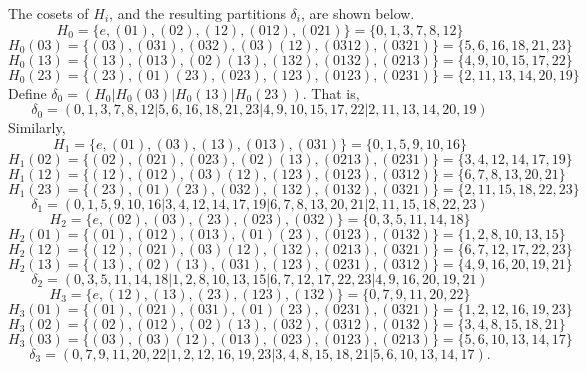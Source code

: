 The cosets of $H_i$, and the resulting partitions $\delta_i$, are shown below.
{\small
  \[
H_0 = \{e, (01), (02), (12), (012), (021)\} = \{0, 1, 3, 7, 8, 12\}
\]
\[
H_0(03) = \{(03), (031), (032), (03)(12), (0312), (0321)\} = \{5,6,16,18,21,23\}
\]
\[
H_0(13) = \{(13), (013), (02)(13), (132), (0132), (0213)\} = \{4,9,10,15,17,22\}
\]
\[
H_0(23) = \{(23), (01)(23), (023), (123), (0123), (0231)\} = \{2,11,13,14,20,19\}
\]
Define $\delta_0 = (H_0|H_0(03)|H_0(13)|H_0(23))$. That is,
\[
\delta_0 = (0, 1, 3, 7, 8, 12|5,6,16,18,21,23|4,9,10,15,17,22|2,11,13,14,20,19)
\]
Similarly,
\[
H_1 = \{e, (01), (03), (13), (013), (031)\} = \{0, 1, 5, 9, 10, 16\}
\]
\[
H_1(02) = \{(02), (021), (023), (02)(13), (0213), (0231)\} = \{3, 4, 12, 14, 17, 19\}
\]
\[
H_1(12) = \{(12), (012), (03)(12), (123), (0123), (0312)\} = \{6, 7, 8, 13, 20, 21\}
\]
\[
H_1(23) = \{(23), (01)(23), (032), (132), (0132), (0321)\} = \{2, 11, 15, 18, 22, 23\}
\]
\[
\delta_1 = (0, 1, 5, 9, 10, 16|3, 4, 12, 14, 17, 19|6, 7, 8, 13, 20, 21|2, 11, 15, 18, 22, 23)
\]
\[
H_2 = \{e, (02), (03), (23), (023), (032)\} = \{0, 3, 5, 11, 14, 18\}
\]
\[
H_2(01) = \{(01), (012), (013), (01)(23), (0123), (0132)\} = \{1,2,8,10,13,15\}
\]
\[
H_2(12) = \{(12), (021), (03)(12), (132), (0213), (0321)\} = \{6,7,12,17,22,23\}
\]
\[
H_2(13) = \{(13), (02)(13), (031), (123), (0231), (0312)\} = \{4,9,16,20,19,21\}
\]
\[
\delta_2 = (0,3,5,11,14,18|1,2,8,10,13,15|6,7,12,17,22,23|4,9,16,20,19,21)
\]
\[
H_3 = \{e, (12), (13), (23), (123), (132)\} = \{0, 7, 9, 11, 20, 22\}
\]
\[
H_3(01) = \{(01), (021), (031), (01)(23), (0231), (0321)\} = \{1,2,12,16,19,23\}
\]
\[
H_3(02) = \{(02), (012), (02)(13), (032), (0312), (0132)\} = \{3,4,8,15,18,21\}
\]
\[
H_3(03) = \{(03), (03)(12), (013), (023), (0123), (0213)\} = \{5,6,10,13,14,17\}
\]
\[
\delta_3 = (0,7,9,11,20,22|1,2,12,16,19,23|3,4,8,15,18,21|5,6,10,13,14,17).
\]
}

